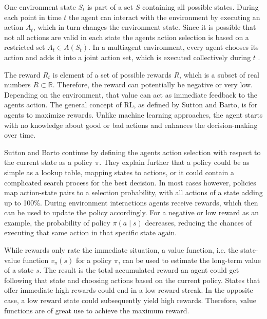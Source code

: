 One environment state $S_t$ is part of a set $S$ containing all possible states. During each point in time $t$ the agent can interact with the environment by executing an action $A_t$, which in turn changes the environment state. Since it is possible that not all actions are valid in each state the agents action selection is based on a restricted set $A_t\in A(S_t)$. In a multiagent environment, every agent chooses its action and adds it into a joint action set, which is executed collectively during $t$ \cite{buba10}.

The reward $R_t$ is element of a set of possible rewards $R$, which is a subset of real numbers $R \subset \mathbb{R}$. Therefore, the reward can potentially be negative or very low. Depending on the environment, that value can act as immediate feedback to the agents action. The general concept of RL, as defined by Sutton and Barto, is for agents to maximize rewards. Unlike machine learning approaches, the agent starts with no knowledge about good or bad actions and enhances the decision-making over time.

Sutton and Barto continue by defining the agents action selection with respect to the current state as a policy $\pi$. They explain further that a policy could be as simple as a lookup table, mapping states to actions, or it could contain a complicated search process for the best decision.
In most cases however, policies map action-state pairs to a selection probability, with all actions of a state adding up to 100\%.
During environment interactions agents receive rewards, which then can be used to update the policy accordingly. For a negative or low reward as an example, the probability of policy $\pi(a \mid s)$ decreases, reducing the chances of executing that same action in that specific state again.

While rewards only rate the immediate situation, a value function, i.e. the state-value function $v_{\pi}(s)$ for a policy $\pi$, can be used to estimate the long-term value of a state $s$. The result is the total accumulated reward an agent could get following that state and choosing actions based on the current policy. States that offer immediate high rewards could end in a 
low reward streak. In the opposite case, a low reward state could subsequently yield high rewards. Therefore, value functions are of great use to achieve the maximum reward.

